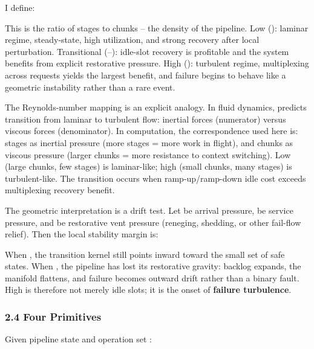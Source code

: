 \documentclass[
]{article}
\begin{document}
I define:

This is the ratio of stages to chunks -- the density of the pipeline.
Low (): laminar regime, steady-state, high utilization, and strong
recovery after local perturbation. Transitional (--): idle-slot recovery
is profitable and the system benefits from explicit restorative
pressure. High (): turbulent regime, multiplexing across requests yields
the largest benefit, and failure begins to behave like a geometric
instability rather than a rare event.

The Reynolds-number mapping is an explicit analogy. In fluid dynamics,
predicts transition from laminar to turbulent flow: inertial forces
(numerator) versus viscous forces (denominator). In computation, the
correspondence used here is: stages as inertial pressure (more stages =
more work in flight), and chunks as viscous pressure (larger chunks =
more resistance to context switching). Low (large chunks, few stages) is
laminar-like; high (small chunks, many stages) is turbulent-like. The
transition occurs when ramp-up/ramp-down idle cost exceeds multiplexing
recovery benefit.

The geometric interpretation is a drift test. Let be arrival pressure,
be service pressure, and be restorative vent pressure (reneging,
shedding, or other fail-flow relief). Then the local stability margin
is:

When , the transition kernel still points inward toward the small set of
safe states. When , the pipeline has lost its restorative gravity:
backlog expands, the manifold flattens, and failure becomes outward
drift rather than a binary fault. High is therefore not merely idle
slots; it is the onset of \textbf{failure turbulence}.

\subsubsection{\texorpdfstring{\textbf{2.4 Four
Primitives}}{2.4 Four Primitives}}\label{four-primitives}

Given pipeline state and operation set :
\end{document}
